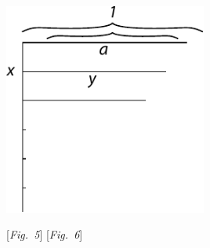 \hspace{5mm}
\begin{minipage}[t]{0.5\textwidth}
\includegraphics[width=0.5\textwidth]{gesamttex/edit_VIII,3/images/LH_35_09_15_001,022_d5.pdf}
\end{minipage}
\pend
\vspace{0.5em}
\pstart
 \hspace{16.5mm} [\textit{Fig.~5}]\hspace{55mm} [\textit{Fig.~6}]
\pend
\vspace{2em}


